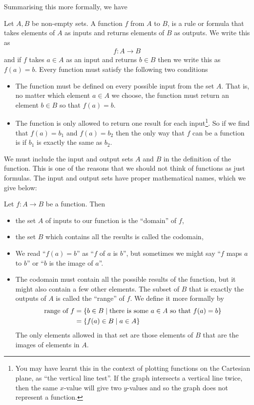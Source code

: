 Summarising this more formally, we have
\begin{defn}
\label{def function}
 Let $A, B$ be non-empty sets. A function $f$ from $A$ to $B$, is a rule or
formula that takes elements of $A$ as inputs and returns elements of $B$ as
outputs. We write this as
\begin{align*}
  f: A \to B
\end{align*}
and if $f$ takes $a \in A$ as an input and returns $b\in B$ then we write this
as $f(a) = b$. Every function must satisfy the following two conditions
\begin{itemize}
\item The function must be defined on every possible input from the set $A$.
That is, no matter which element $a \in A$ we choose, the function must return
an element $b \in B$ so that $f(a)=b$.

\item The function is only allowed to return one result for each
input\footnote{You may have learnt this in the context of plotting functions on
the Cartesian plane, as ``the vertical line test''. If the graph intersects a
vertical line twice, then the same $x$-value will give two $y$-values and so
the graph does not represent a function.}. So if we find that $f(a)=b_1$ and
$f(a)=b_2$ then the only way that $f$ can be a function is if $b_1$ is exactly
the same as $b_2$.
\end{itemize}
\end{defn}
We must include the input and output sets $A$ and $B$ in the definition of the
function. This is one of the reasons that we should not think of
functions as just formulas. The input and output sets have proper mathematical
names, which we give below:
\begin{defn}
Let $f:A \to B$ be a function. Then
\begin{itemize}
\item the set $A$ of inputs to our function is the ``domain'' of $f$,
\item the set $B$ which contains all the results is called the codomain,
\item We read ``$f(a) = b$'' as ``$f$ of $a$ is $b$'', but sometimes we might
say ``$f$ maps $a$ to $b$'' or ``$b$ is the image of $a$''.

\item The codomain must contain all the possible results of the function, but
it might also contain a few other elements. The subset of $B$ that is
exactly the outputs of $A$ is called the ``range'' of $f$. We define it more
formally by
\begin{align*}
	\text{range of } f &= \left\{b \in B \;|\; \text{there is some } a \in
A \text{ so that } f(a) = b\right\} \\
  &= \left\{f(a) \in B \;|\; a \in A\right\}
\end{align*}
  The only elements allowed in that set are those elements of $B$ that are the
images of elements in $A$.
\end{itemize}
\end{defn}


